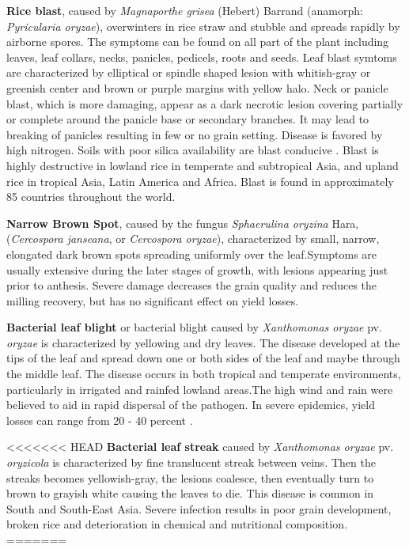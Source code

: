 \documentclass[12pt, oneside]{report}
\begin{document}
\textbf{Rice blast}, caused by \textit{Magnaporthe grisea} (Hebert) Barrand (anamorph: \textit{Pyricularia oryzae}), overwinters in rice straw and stubble and spreads rapidly by airborne spores. The symptoms can be found on all part of the plant including leaves, leaf collars, necks, panicles, pedicels, roots and seeds. Leaf blast symtoms are characterized by elliptical or spindle shaped lesion with whitish-gray or greenish center and brown or purple margins with yellow halo. Neck or panicle blast, which is more damaging, appear as a dark necrotic lesion covering partially or complete around the panicle base or secondary branches. It may lead to breaking of panicles resulting in few or no grain setting. Disease is favored by high nitrogen. Soils with poor silica availability are blast conducive \citep{irrirkb}. Blast is highly destructive in lowland rice in temperate and subtropical Asia, and upland rice in tropical Asia, Latin America and Africa. Blast is found in approximately 85 countries throughout the world.

\textbf{Narrow Brown Spot}, caused by the fungus \textit{Sphaerulina oryzina} Hara, (\textit{Cercospora janseana}, or \textit{Cercospora oryzae}), characterized by small, narrow, elongated dark brown spots spreading uniformly over the leaf.Symptoms are usually extensive during the later stages of growth, with lesions appearing just prior to anthesis. Severe damage decreases the grain quality and reduces the milling recovery, but has no significant effect on yield losses.

\textbf{Bacterial leaf blight} or bacterial blight caused by \textit{Xanthomonas oryzae} pv. \textit{oryzae} is characterized by yellowing and dry leaves. The disease developed at the tips of the leaf and spread down one or both sides of the leaf and maybe through the middle leaf. The disease occurs in both tropical and temperate environments, particularly in irrigated and rainfed lowland areas.The high wind and rain were believed to aid in rapid dispersal of the pathogen. In severe epidemics, yield losses can range from 20 - 40 percent \citep{sonti1998bacterial, irrirkb}.

<<<<<<< HEAD
\textbf{Bacterial leaf streak} caused by \textit{Xanthomonas oryzae} pv. \textit{oryzicola} is characterized by fine translucent streak between veins. Then the streaks becomes yellowish-gray, the lesions coalesce, then eventually turn to brown to grayish white causing the leaves to die. This disease is common in South and South-East Asia. Severe infection results in poor grain development, broken rice and deterioration in chemical and nutritional composition.
=======
\end{document}
